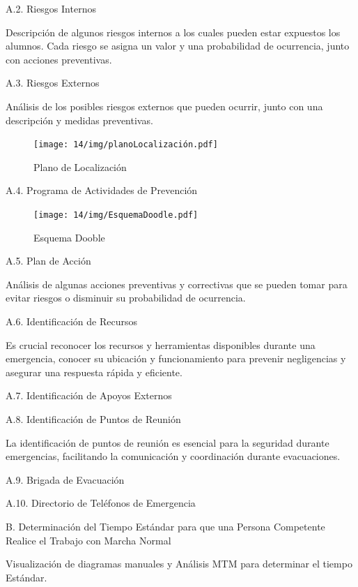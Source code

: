     A.2. Riesgos Internos
    
    Descripción de algunos riesgos internos a los cuales pueden estar expuestos los alumnos. Cada riesgo se asigna un valor y una probabilidad de ocurrencia, junto con acciones preventivas.
    
    A.3. Riesgos Externos
    
    Análisis de los posibles riesgos externos que pueden ocurrir, junto con una descripción y medidas preventivas.
    
    \begin{figure}[H]
        \centering
        \texttt{[image: 14/img/planoLocalización.pdf]}
        \caption{Plano de Localización}
    \end{figure}
    A.4. Programa de Actividades de Prevención
    
    \begin{figure}[H]
        \centering
        \texttt{[image: 14/img/EsquemaDoodle.pdf]}
        \caption{Esquema Dooble}
    \end{figure}
    
    A.5. Plan de Acción
    
    Análisis de algunas acciones preventivas y correctivas que se pueden tomar para evitar riesgos o disminuir su probabilidad de ocurrencia.
    
    A.6. Identificación de Recursos
    
    Es crucial reconocer los recursos y herramientas disponibles durante una emergencia, conocer su ubicación y funcionamiento para prevenir negligencias y asegurar una respuesta rápida y eficiente.
    
    A.7. Identificación de Apoyos Externos
    
    A.8. Identificación de Puntos de Reunión
    
    La identificación de puntos de reunión es esencial para la seguridad durante emergencias, facilitando la comunicación y coordinación durante evacuaciones.
    
    A.9. Brigada de Evacuación
    
    A.10. Directorio de Teléfonos de Emergencia
    
    B. Determinación del Tiempo Estándar para que una Persona Competente Realice el Trabajo con Marcha Normal
    
    Visualización de diagramas manuales y Análisis MTM para determinar el tiempo Estándar.
    
